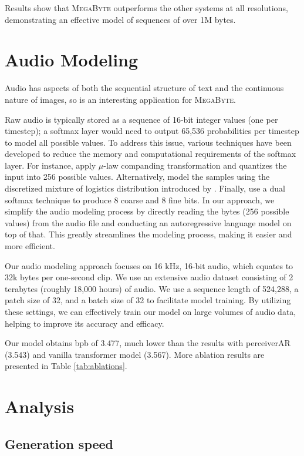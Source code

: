Results show that \textsc{MegaByte} outperforms the other systems at all resolutions, demonstrating an effective model of sequences of over 1M bytes.

\section{Audio Modeling}
\label{sec:speech}

Audio has aspects of both the sequential structure of text and the continuous nature of images, so is an interesting application for \textsc{MegaByte}.

Raw audio is typically stored as a sequence of 16-bit integer values (one per timestep); a softmax layer would need to output 65,536 probabilities per timestep to model all possible values. To address this issue, various techniques have been developed to reduce the memory and computational requirements of the softmax layer. For instance, \citet{wavenet} apply $\mu$-law companding transformation and quantizes the input into 256 possible values. Alternatively, \citet{parawavenet} model the samples using the discretized mixture of logistics distribution introduced by \citet{pixcelcnn++}. Finally, \citet{wavernn} use a dual softmax technique to produce 8 coarse and 8 fine bits. In our approach, we simplify the audio modeling process by directly reading the bytes (256 possible values) from the audio file and conducting an autoregressive language model on top of that. This greatly streamlines the modeling process, making it easier and more efficient.

Our audio modeling approach focuses on 16 kHz, 16-bit audio, which equates to 32k bytes per one-second clip. We use an extensive audio dataset consisting of 2 terabytes (roughly 18,000 hours) of audio. We use a sequence length of 524,288, a patch size of 32, and a batch size of 32 to facilitate model training. By utilizing these settings, we can effectively train our model on large volumes of audio data, helping to improve its accuracy and efficacy.

Our model obtains bpb of 3.477, much lower than the results with perceiverAR (3.543) and vanilla transformer model (3.567). More ablation results are presented in Table \ref{tab:ablations}. 

\section{Analysis}
\subsection{Generation speed}

